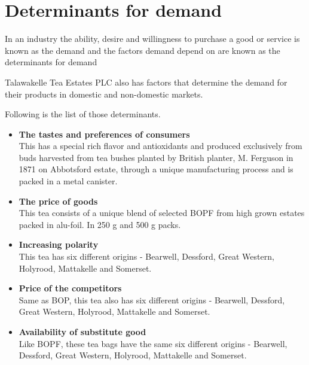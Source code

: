 \documentclass[12pt]{report}
\begin{document}
\section{Determinants for demand}
In an industry the ability, desire and willingness to purchase a good or service is known as the demand and the factors demand depend on are known as the determinants for demand

Talawakelle Tea Estates PLC also has factors that determine the demand for their products in domestic and non-domestic markets.

\noindent
Following is the list of those determinants.


\begin{itemize}
	\item {\bf{The tastes and preferences of consumers}} \\
	      This has a special rich flavor and antioxidants and produced exclusively from buds harvested from tea bushes planted by British planter, M. Ferguson in 1871 on Abbotsford estate, through a unique manufacturing process and is packed in a metal canister.

	\item {\bf{The price of goods}} \\
	      This tea consists of a unique blend of selected BOPF from high grown estates packed in alu-foil. In 250 g and 500 g packs.

	\item {\bf{Increasing polarity}} \\
	      This tea has six different origins - Bearwell, Dessford, Great Western, Holyrood, Mattakelle and Somerset.

	\item {\bf{Price of the competitors}} \\
	      Same as BOP, this tea also has six different origins - Bearwell, Dessford, Great Western, Holyrood, Mattakelle and Somerset.

	\item {\bf{Availability of substitute good}} \\
	      Like BOPF, these tea bags have the same six different origins - Bearwell, Dessford, Great Western, Holyrood, Mattakelle and Somerset.
\end{itemize}
\end{document}

